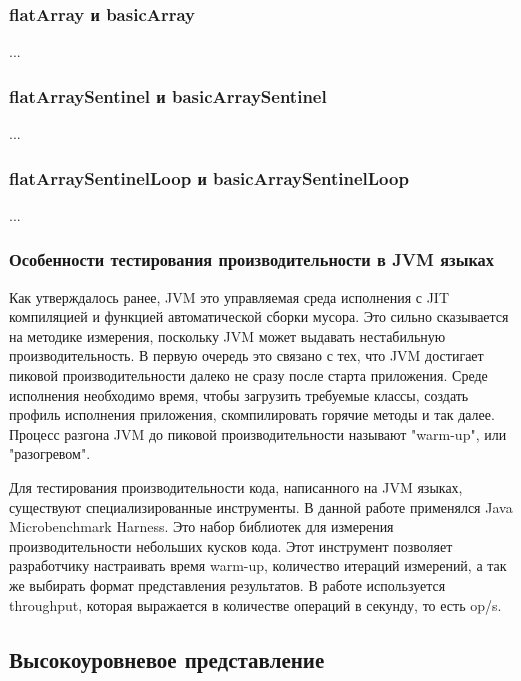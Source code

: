 \subsubsection{flatArray и basicArray}
...

\subsubsection{flatArraySentinel и basicArraySentinel}
...

\subsubsection{flatArraySentinelLoop и basicArraySentinelLoop}
...

\subsubsection{Особенности тестирования производительности в JVM языках}
Как утверждалось ранее, JVM это управляемая среда исполнения с JIT компиляцией и функцией автоматической сборки мусора. Это сильно сказывается на методике измерения, поскольку JVM может выдавать нестабильную производительность. 
В первую очередь это связано с тех, что JVM достигает пиковой производительности далеко не сразу после старта приложения.
Среде исполнения необходимо время, чтобы загрузить требуемые классы, создать профиль исполнения приложения, скомпилировать горячие методы и так далее.
Процесс разгона JVM до пиковой производительности называют "warm-up", или "разогревом".
\par
Для тестирования производительности кода, написанного на JVM языках, существуют специализированные инструменты. 
В данной работе применялся Java Microbenchmark Harness\cite{jmh}. Это набор библиотек для измерения производительности небольших кусков кода.
Этот инструмент позволяет разработчику настраивать время warm-up, количество итераций измерений, а так же выбирать формат представления результатов. 
В работе используется throughput, которая выражается в количестве операций в секунду, то есть op/s. 

\subsection{Высокоуровневое представление}

